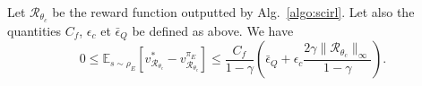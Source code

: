 \documentclass[english,utf8]{./hermes-journal}
\newcommand{\R}{\mathcal{R}}
\newcommand{\E}{\mathbb{E}}
\begin{document}
\begin{theorem}
  \label{th}
  Let $\R_{\theta_c}$ be the reward function outputted by
  Alg.~\ref{algo:scirl}. Let also the quantities $C_f$, $\epsilon_c$
  et $\bar{\epsilon}_Q$ be defined as above. We have
  \begin{equation}
    0\leq
    \E_{s\sim\rho_E}[v^*_{\R_{\theta_c}}-v^{\pi_E}_{\R_{\theta_c}}]
    \leq \frac{C_f}{1-\gamma}\left(\bar{\epsilon}_Q +
    \epsilon_c\frac{2\gamma\|\R_{\theta_c}\|_\infty}{1-\gamma}
    \right).
  \end{equation}
\end{theorem}
\end{document}
